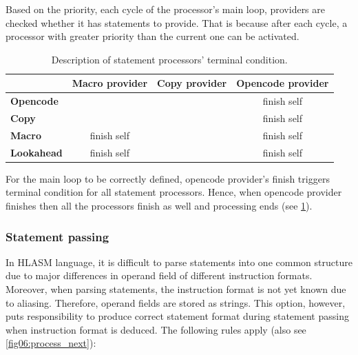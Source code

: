 Based on the priority, each cycle of the processor's main loop, providers are checked whether it has statements to provide. That is because after each cycle, a processor with greater priority than the current one can be activated. 

\begin{table}
	\centering
	\begin{tabular}{lccc}
		                   & \textbf{Macro provider} & \textbf{Copy provider} & \textbf{Opencode provider} \\ \toprule
		\textbf{Opencode}  &                                            &                                           &                  finish self                  \\
		\textbf{Copy}      &                                            &                                           &                  finish self                  \\
		\textbf{Macro}     &                finish self                 &                                           &                  finish self                  \\
		\textbf{Lookahead} &                finish self                 &                                           &                  finish self                  \\ \bottomrule
	\end{tabular}
	\caption{Description of statement processors' terminal condition.}
	\label{tab06:term_cond}
\end{table}

For the main loop to be correctly defined, opencode provider's finish triggers terminal condition for all statement processors. Hence, when opencode provider finishes then all the processors finish as well and processing ends (see \cref{tab06:term_cond}).

\subsubsection{Statement passing}
\label{lab06:proc_stat}

In HLASM language, it is difficult to parse statements into one common structure due to major differences in operand field of different instruction formats. Moreover, when parsing statements, the instruction format is not yet known due to aliasing. Therefore, operand fields are stored as strings. This option, however, puts responsibility to produce correct statement format during statement passing when instruction format is deduced. The following rules apply (also see \cref{fig06:process_next}):

